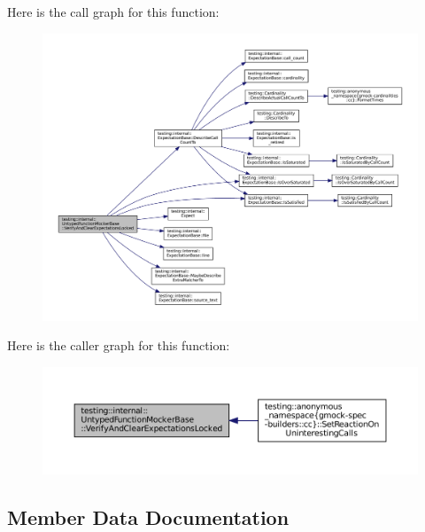 Here is the call graph for this function\+:
\nopagebreak
\begin{figure}[H]
\begin{center}
\leavevmode
\includegraphics[width=350pt]{classtesting_1_1internal_1_1UntypedFunctionMockerBase_a3f1d62a1662a3daa2895b3af963be269_cgraph}
\end{center}
\end{figure}
Here is the caller graph for this function\+:
\nopagebreak
\begin{figure}[H]
\begin{center}
\leavevmode
\includegraphics[width=350pt]{classtesting_1_1internal_1_1UntypedFunctionMockerBase_a3f1d62a1662a3daa2895b3af963be269_icgraph}
\end{center}
\end{figure}


\subsection{Member Data Documentation}
\mbox{\label{classtesting_1_1internal_1_1UntypedFunctionMockerBase_adf35c589969bb985668616031cb9ed56}} 
